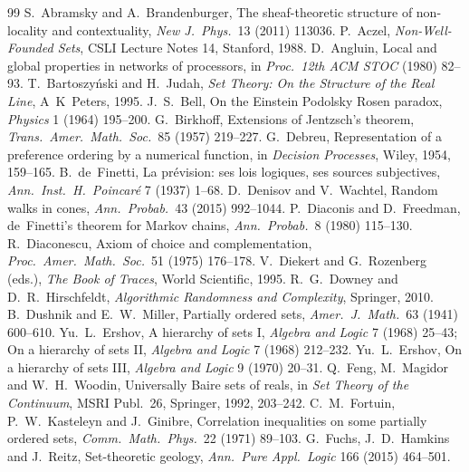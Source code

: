 \documentclass[11pt]{article}
\theoremstyle{definition}
\theoremstyle{remark}
\begin{document}
\begin{thebibliography}{99}\small
{} S.~Abramsky and A.~Brandenburger, The sheaf-theoretic structure of non-locality and contextuality, \emph{New J.\ Phys.}\ 13 (2011) 113036.
 P.~Aczel, \emph{Non-Well-Founded Sets}, CSLI Lecture Notes 14, Stanford, 1988.
 D.~Angluin, Local and global properties in networks of processors, in \emph{Proc.\ 12th ACM STOC} (1980) 82--93.
 T.~Bartoszy\'nski and H.~Judah, \emph{Set Theory: On the Structure of the Real Line}, A~K~Peters, 1995.
 J.~S.~Bell, On the Einstein Podolsky Rosen paradox, \emph{Physics} 1 (1964) 195--200.
 G.~Birkhoff, Extensions of Jentzsch's theorem, \emph{Trans.\ Amer.\ Math.\ Soc.}\ 85 (1957) 219--227.
 G.~Debreu, Representation of a preference ordering by a numerical function, in \emph{Decision Processes}, Wiley, 1954, 159--165.
 B.~de~Finetti, La pr\'evision: ses lois logiques, ses sources subjectives, \emph{Ann.\ Inst.\ H.\ Poincar\'e} 7 (1937) 1--68.
 D.~Denisov and V.~Wachtel, Random walks in cones, \emph{Ann.\ Probab.}\ 43 (2015) 992--1044.
 P.~Diaconis and D.~Freedman, de~Finetti's theorem for Markov chains, \emph{Ann.\ Probab.}\ 8 (1980) 115--130.
 R.~Diaconescu, Axiom of choice and complementation, \emph{Proc.\ Amer.\ Math.\ Soc.}\ 51 (1975) 176--178.
 V.~Diekert and G.~Rozenberg (eds.), \emph{The Book of Traces}, World Scientific, 1995.
 R.~G.~Downey and D.~R.~Hirschfeldt, \emph{Algorithmic Randomness and Complexity}, Springer, 2010.
 B.~Dushnik and E.~W.~Miller, Partially ordered sets, \emph{Amer.\ J.\ Math.}\ 63 (1941) 600--610.
 Yu.~L.~Ershov, A hierarchy of sets I, \emph{Algebra and Logic} 7 (1968) 25--43; On a hierarchy of sets II, \emph{Algebra and Logic} 7 (1968) 212--232.
 Yu.~L.~Ershov, On a hierarchy of sets III, \emph{Algebra and Logic} 9 (1970) 20--31.
 Q.~Feng, M.~Magidor and W.~H.~Woodin, Universally Baire sets of reals, in \emph{Set Theory of the Continuum}, MSRI Publ.\ 26, Springer, 1992, 203--242.
 C.~M.~Fortuin, P.~W.~Kasteleyn and J.~Ginibre, Correlation inequalities on some partially ordered sets, \emph{Comm.\ Math.\ Phys.}\ 22 (1971) 89--103.
 G.~Fuchs, J.~D.~Hamkins and J.~Reitz, Set-theoretic geology, \emph{Ann.\ Pure Appl.\ Logic} 166 (2015) 464--501.

\end{thebibliography}
\end{document}
